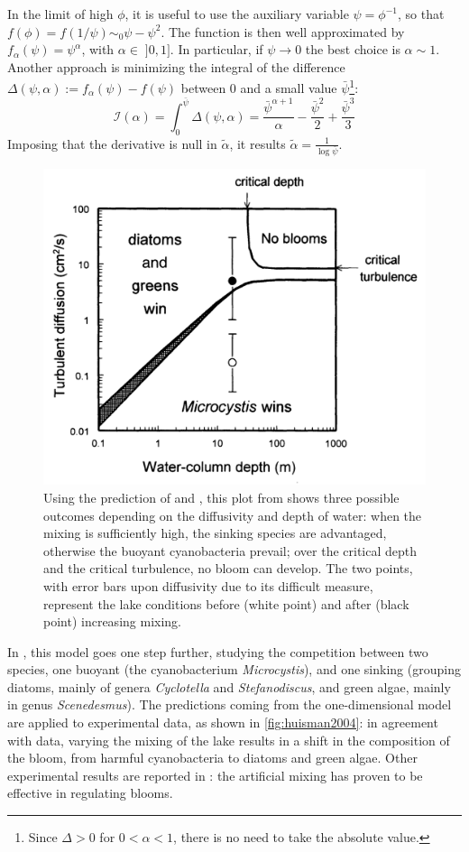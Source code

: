 In the limit of high $\phi$, it is useful to use the auxiliary variable \( \psi = \phi^{-1}\), so that \( f(\phi) = f(1/\psi) \sim_0 \psi - \psi^2\). The function is then well approximated by $f_\alpha(\psi) = \psi ^\alpha $, with \(\alpha\in\;]0,1]\). In particular, if \(\psi \rightarrow 0 \) the best choice is \( \alpha \sim 1 \). Another approach is minimizing the integral of the difference \( \Delta(\psi,\alpha) := f_\alpha(\psi) - f(\psi) \) between $0$ and a small value $\bar{\psi}$\footnote{Since $\Delta>0$ for \(0<\alpha<1\), there is no need to take the absolute value.}: 
\[ \mathcal{I}(\alpha) = \int_0^{\bar{\psi}} \Delta(\psi,\alpha) =\frac{\bar{\psi}^{\alpha+1}}{\alpha} -\frac {\bar{\psi}^2}{2} + \frac{\bar{\psi}^3}{3} \]
Imposing that the derivative is null in $\tilde{\alpha}$, it results \(\tilde{\alpha} = \frac{1}{\log\bar{\psi}} \).

\begin{figure} [ht]
    \centering
    \includegraphics[width=.7\textwidth]{img/references/huisman2004}
    \caption{Using the prediction of \autocite{Ebert2001CriticalBlooms} and \autocite{Huisman2002HowPersist}, this plot from \autocite{Huisman2004ChangesSpecies} shows three possible outcomes depending on the diffusivity and depth of water: when the mixing is sufficiently high, the sinking species are advantaged, otherwise the buoyant cyanobacteria prevail; over the critical depth and the critical turbulence, no bloom can develop. The two points, with error bars upon diffusivity due to its difficult measure, represent the lake conditions before (white point) and after (black point) increasing mixing.} 
    \label{fig:huisman2004}
\end{figure}
In \autocite{Huisman2004ChangesSpecies}, this model goes one step further, studying the competition between two species, one buoyant (the cyanobacterium \textit{Microcystis}), and one sinking (grouping diatoms, mainly of genera \textit{Cyclotella} and \textit{Stefanodiscus}, and green algae, mainly in genus \textit{Scenedesmus}). The predictions coming from the one-dimensional model are applied to experimental data, as shown in \autoref{fig:huisman2004}: in agreement with data, varying the mixing of the lake results in a shift in the composition of the bloom, from harmful cyanobacteria to diatoms and green algae.
Other experimental results are reported in  \autocite{Visser2016ArtificialReview}: the artificial mixing has proven to be effective in regulating blooms.

